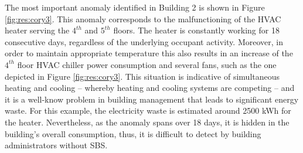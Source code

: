 The most important anomaly identified in Building 2 is shown in Figure \ref{fig:res:cory3}.
This anomaly corresponds to the malfunctioning of the HVAC heater serving the $4^{th}$ and $5^{th}$ floors. 
The heater is constantly working for 18 consecutive days, regardless of the underlying occupant activity.
Moreover, in order to maintain appropriate temperature this also results in an increase of the $4^{th}$ floor HVAC chiller power consumption 
and several fans, such as the one depicted in Figure \ref{fig:res:cory3}.
This situation is indicative of simultaneous heating and cooling -- whereby heating and cooling systems are competing -- and it 
is a well-know problem in building management that leads to significant energy waste.
For this example, the electricity waste is estimated around 2500 kWh for the heater.
Nevertheless, as the anomaly spans over 18 days, it is hidden in the building's overall consumption, thus, it is difficult to detect 
by building administrators without SBS.
